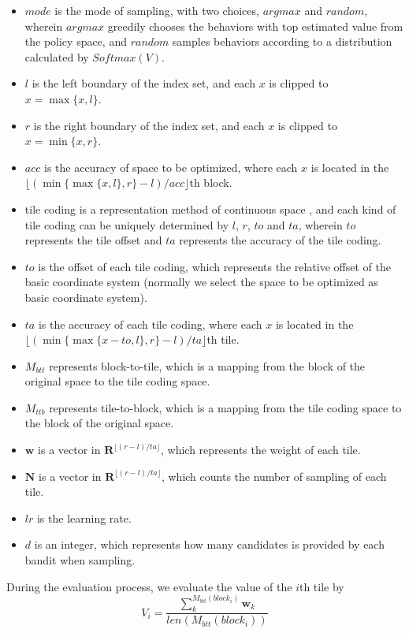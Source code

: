 \documentclass[nohyperref]{article}
\theoremstyle{plain}
\begin{document}
\begin{itemize}
    \item $mode$ is the mode of sampling, with two choices, $argmax$ and $random$, wherein $argmax$ greedily chooses the behaviors with top estimated value from the policy space, and $random$ samples behaviors according to a distribution calculated by $Softmax(V)$.
    \item $l$ is the left boundary of the index set, and each $x$ is clipped to $x = \max \{x, l\}$.
    \item $r$ is the right boundary of the index set, and each $x$ is clipped to $x = \min \{x, r\}$.
    \item $acc$ is the accuracy of space to be optimized, where each $x$ is located in the $\lfloor (\min\{\max\{x, l\}, r\} - l) / acc \rfloor$th block.
    \item tile coding is a representation method of continuous space \citep{sutton}, and each kind of tile coding can be uniquely determined by $l$, $r$, $to$ and $ta$, wherein $to$ represents the tile offset and $ta$ represents the accuracy of the tile coding.
    \item $to$ is the offset of each tile coding, which represents the relative offset of the basic coordinate system (normally we select the space to be optimized as basic coordinate system).
    \item $ta$ is the accuracy of each tile coding, where each $x$ is located in the $\lfloor (\min\{\max\{x-to, l\}, r\} - l) / ta \rfloor$th tile.
    \item $M_{btt}$ represents block-to-tile, which is a mapping from the block of the original space to the tile coding space.
    \item $M_{ttb}$ represents tile-to-block, which is a mapping from the tile coding space to the block of the original space.
    \item $\textbf{w}$ is a vector in $\mathbf{R}^{\lfloor (r-l) / ta \rfloor}$, which represents the weight of each tile.
    \item $\textbf{N}$ is a vector in $\mathbf{R}^{\lfloor (r-l) / ta \rfloor}$, which counts the number of sampling of each tile.
    \item $lr$ is the learning rate.
    \item $d$ is an integer, which represents how many candidates is provided by each bandit when sampling.
\end{itemize}

During the evaluation process, we evaluate the value of the $i$th tile by
\begin{equation}
\label{eq:bandit_eval}
V_i = \frac{\sum_{k}^{M_{btt}(block_i)} \textbf{w}_k}{len(M_{btt}(block_i))}
\end{equation}
\end{document}
